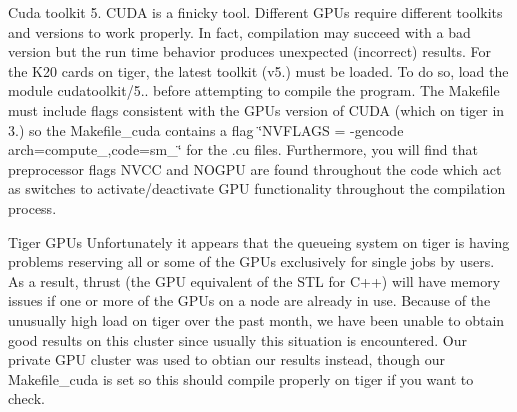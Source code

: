 \begin{DoxyEnumerate}
\item Cuda toolkit 5. C\-U\-D\-A is a finicky tool. Different G\-P\-Us require different toolkits and versions to work properly. In fact, compilation may succeed with a bad version but the run time behavior produces unexpected (incorrect) results. For the K20 cards on tiger, the latest toolkit (v5.) must be loaded. To do so, load the module cudatoolkit/5.. before attempting to compile the program. The Makefile must include flags consistent with the G\-P\-Us version of C\-U\-D\-A (which on tiger in 3.) so the Makefile\-\_\-cuda contains a flag \char`\"{}\-N\-V\-F\-L\-A\-G\-S = -\/gencode arch=compute\-\_,code=sm\-\_\char`\"{} for the .cu files. Furthermore, you will find that preprocessor flags N\-V\-C\-C and N\-O\-G\-P\-U are found throughout the code which act as switches to activate/deactivate G\-P\-U functionality throughout the compilation process.
\end{DoxyEnumerate}


\begin{DoxyEnumerate}
\item Tiger G\-P\-Us Unfortunately it appears that the queueing system on tiger is having problems reserving all or some of the G\-P\-Us exclusively for single jobs by users. As a result, thrust (the G\-P\-U equivalent of the S\-T\-L for C++) will have memory issues if one or more of the G\-P\-Us on a node are already in use. Because of the unusually high load on tiger over the past month, we have been unable to obtain good results on this cluster since usually this situation is encountered. Our private G\-P\-U cluster was used to obtian our results instead, though our Makefile\-\_\-cuda is set so this should compile properly on tiger if you want to check. 
\end{DoxyEnumerate}